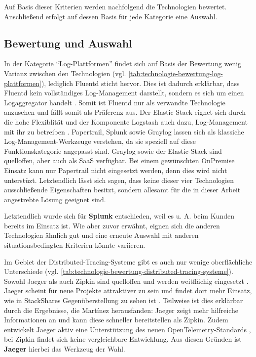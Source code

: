 Auf Basis dieser Kriterien werden nachfolgend die Technologien bewertet. Anschließend erfolgt auf dessen Basis für jede Kategorie eine Auswahl.

\subsection{Bewertung und Auswahl}
\label{subsec:bewertung-und-auswahl}

In der Kategorie \enquote{Log-Plattformen} findet sich auf Basis der Bewertung wenig Varianz zwischen den Technologien (vgl. \autoref{tab:technologie-bewertung-log-plattformen}), lediglich Fluentd sticht hervor. Dies ist dadurch erklärbar, dass Fluentd kein vollständiges Log-Management darstellt, sondern es sich um einen Logaggregator handelt \cite{FluentdAggregator}. Somit ist Fluentd nur als verwandte Technologie anzusehen und fällt somit als Präferenz aus. Der Elastic-Stack eignet sich durch die hohe Flexiblität und der Komponente Logstash auch dazu, Log-Management mit ihr zu betreiben  \cite{ThreatIdentificationFromAccessLogsUsingElasticStack} \cite{DesignLogManagementSystem}. Papertrail, Splunk sowie Graylog lassen sich als klassiche Log-Management-Werkzeuge verstehen, da sie speziell auf diese Funktionskategorie angepasst sind. Graylog sowie der Elastic-Stack sind quelloffen, aber auch als SaaS verfügbar. Bei einem gewünschten OnPremise Einsatz kann nur Papertrail nicht eingesetzt werden, denn dies wird nicht unterstüzt. Letztendlich lässt sich sagen, dass keine dieser vier Technologien ausschließende Eigenschaften besitzt, sondern allesamt für die in dieser Arbeit angestrebte Lösung geeignet sind.

Letztendlich wurde sich für \textbf{Splunk} entschieden, weil es u. A. beim Kunden bereits im Einsatz ist. Wie aber zuvor erwähnt, eignen sich die anderen Technologien ähnlich gut und eine erneute Auswahl mit anderen situationsbedingten Kriterien könnte variieren.



Im Gebiet der Distributed-Tracing-Systeme gibt es auch nur wenige oberflächliche Unterschiede (vgl. \autoref{tab:technologie-bewertung-distributed-tracing-systeme}). Sowohl Jaeger als auch Zipkin sind quelloffen und werden weitflächig eingesetzt \cite{AnalysisOfDistributedTracingSystemsEffectOnPerformance}. Jaeger scheint für neue Projekte attraktiver zu sein und findet dort mehr Einsatz, wie in StackShares Gegenüberstellung zu sehen ist \cite{StackShareJaegerVsZipkin}. Teilweise ist dies erklärbar durch die Ergebnisse, die Mart{\'i}nez \etal \cite{ComparisonOfE2ETestingToolsForMicroservices} herausfanden: Jaeger zeigt mehr hilfreiche Informationen an und kann diese schneller bereitstellen als Zipkin. Zudem entwickelt Jaeger aktiv eine Unterstützung des neuen OpenTelemetry-Standards \cite{JaegerOpenTelemetry}, bei Zipkin findet sich keine vergleichbare Entwicklung. Aus diesen Gründen ist \textbf{Jaeger} hierbei das Werkzeug der Wahl.

